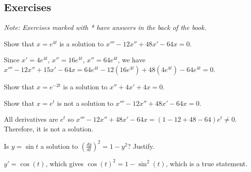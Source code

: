 %



\subsection{Exercises}

\noindent
\emph{Note: Exercises marked with * have answers in the
back of the book.}


\begin{exercise}
Show that $x = e^{4t}$ is a solution to $x'''-12 x'' + 48 x' - 64 x = 0$.
\end{exercise}
\comboSol{%
}
{%
Since $x' = 4e^{4t}$, $x'' = 16e^{4t}$, $x'' = 64e^{4t}$, we have
$x''' - 12x'' + 15x' - 64x = 64e^{4t} - 12(16e^{4t}) + 48(4e^{4t}) - 64e^{4t} = 0$.
}

\begin{exercise}\ansMark%
Show that $x = e^{-2t}$ is a solution to $x'' + 4x' + 4x = 0$.
\end{exercise}

\begin{exercise}
Show that $x = e^{t}$ is not a solution to $x'''-12 x'' + 48 x' - 64 x = 0$.
\end{exercise}
\comboSol{%
}
{%
All derivatives are $e^t$ so
$x''' - 12x'' + 48x' - 64x = (1 - 12 + 48 - 64)e^t \neq 0$. Therefore, it is not a solution.
}

\begin{exercise}
Is $y = \sin t$ a solution to ${\left( \frac{dy}{dt} \right)}^2 = 1 - y^2$?
Justify.
\end{exercise}
\comboSol{%
}
{%
$y' = \cos(t)$, which gives $\cos(t)^2 = 1 - \sin^2(t)$, which is a true statement. 
}

